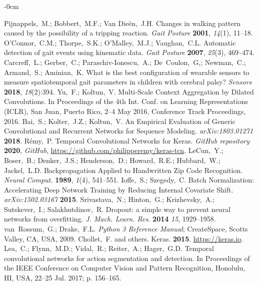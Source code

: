\documentclass[sensors,article,submit,pdftex,moreauthors]{Definitions/mdpi}
\begin{document}
\begin{adjustwidth}{-\extralength}{0cm}
\begin{thebibliography}{999}
	Pijnappels,~M.; Bobbert,~M.F.; Van Die\"{e}n,~J.H. Changes in walking pattern caused by the possibility of a tripping reaction. {\em Gait Posture} {\bf 2001}, {\em 14}(1), 11--18.
	O'Connor,~C.M.; Thorpe,~S.K.; O'Malley,~M.J.; Vaughan,~C.L. Automatic detection of gait events using kinematic data. {\em Gait Posture} {\bf 2007}, {\em 25}(3), 469--474.
	Carcreff,~L.; Gerber,~C.; Paraschiv-Ionescu,~A.; De~Coulon,~G,; Newman,~C.; Armand,~S.; Aminian,~K. What is the best configuration of wearable sensors
	to measure spatiotemporal gait parameters in children with cerebral palsy? {\em Sensors} {\bf 2018}, {\em 18}(2):394.
	Yu,~F.; Koltun,~V. Multi-Scale Context Aggregation by Dilated Convolutions. In Proceedings of the 4th Int. Conf. on Learning Representations (ICLR), San Juan, Puerto Rico, 2--4 May 2016, Conference Track Proceedings, 2016.
	Bai,~S.; Kolter,~J.Z.; Koltun,~V. An Empirical Evaluation of Generic Convolutional and Recurrent Networks for Sequence Modeling. {\em arXiv:1803.01271} {\bf 2018}.
	R\'{e}my,~P. Temporal Convolutional Networks for Keras. {\em GitHub repository} {\bf 2020}, {\em GitHub}, \url{https://github.com/philipperemy/keras-tcn}.
	LeCun,~Y.; Boser,~B.; Denker,~J.S.; Henderson,~D.; Howard,~R.E.; Hubbard,~W.; Jackel,~L.D. Backpropagation Applied to Handwritten Zip Code Recognition. {\em Neural Comput.} {\bf 1989}, {\em 1}(4), 541--551.
	Ioffe,~S.; Szegedy,~C. Batch Normalization: Accelerating Deep Network Training by
	Reducing Internal Covariate Shift. {\em arXiv:1502.03167} {\bf 2015}.
	Srivastava,~N.; Hinton,~G.; Krizhevsky,~A.; Sutskever,~I.; Salakhutdinov,~R. Dropout: a
	simple way to prevent neural networks from overfitting. {\em J. Mach. Learn. Res.} {\bf 2014} {\em 15}, 1929--1958.
	van~Rossum,~G.; Drake,~F.L. {\em Python 3 Reference Manual}; CreateSpace, Scotts Valley, CA, USA, 2009.
	Chollet,~F. and others. Keras. {\bf 2015}. \url{https://keras.io}.
	Lea,~C.; Flynn,~M.D.; Vidal,~R.; Reiter,~A.; Hager,~G.D. Temporal convolutional networks for action segmentation and detection. In Proceedings of the IEEE Conference on Computer Vision and Pattern Recognition, Honolulu, HI, USA, 22--25 Jul. 2017; p. 156--165.

\end{thebibliography}
\end{adjustwidth}
\end{document}
